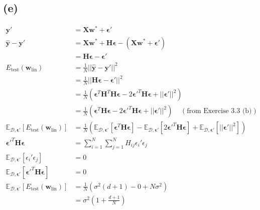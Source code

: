 \documentclass{article}
\begin{document}
	\subsection*{(e)}
		\begin{align*}
			\mathbf y' &= \mathbf X\mathbf w^* + \bm\epsilon'\\
			\hat{\mathbf y} - \mathbf y' &= \mathbf{Xw}^* + \mathbf H\bm\epsilon - (\mathbf{Xw}^* + \bm\epsilon')\\
			&= \mathbf H\bm\epsilon - \bm\epsilon'\\
			E_\text{test}(\mathbf w_{\text{lin}}) &=\frac1N||\hat{\mathbf y} - \mathbf y'||^2\\
			&= \frac1N||\mathbf H\bm\epsilon - \bm\epsilon'||^2\\
			&= \frac1N(\bm\epsilon^T\mathbf H^T\mathbf H\bm\epsilon - 2\bm\epsilon'^T\mathbf H\bm\epsilon + ||\bm\epsilon'||^2)\\
			&= \frac1N(\bm\epsilon^T\mathbf H\bm\epsilon - 2\bm\epsilon'^T\mathbf H\bm\epsilon + ||\bm\epsilon'||^2)\ \ \ \ \ (\text{from Exercise 3.3 (b)})\\
			\mathbb E_{\mathcal D, \bm\epsilon'}[E_\text{test}(\mathbf w_{\text{lin}})] &= \frac1N(\mathbb E_{\mathcal D, \bm\epsilon'}[\bm\epsilon^T\mathbf H\bm\epsilon] - \mathbb E_{\mathcal D, \bm\epsilon'}[2\bm\epsilon'^T\mathbf H\bm\epsilon] + \mathbb E_{\mathcal D, \bm\epsilon'}[||\bm\epsilon'||^2])\\
			\bm\epsilon'^T\mathbf H\bm\epsilon &= \sum\limits_{i=1}^N\sum\limits_{j=1}^NH_{ij}\epsilon_i'\epsilon_j\\
			\mathbb E_{\mathcal D, \bm\epsilon'}[\epsilon_i'\epsilon_j] &= 0\\
			\mathbb E_{\mathcal D, \bm\epsilon'}[\bm\epsilon'^T\mathbf H\bm\epsilon] &= 0\\
			\mathbb E_{\mathcal D, \bm\epsilon'}[E_\text{test}(\mathbf w_{\text{lin}})] &=\frac1N(\sigma^2(d+1) - 0 + N\sigma^2)\\
			&= \sigma^2(1 + \frac{d+1}N)
		\end{align*}
\end{document}
